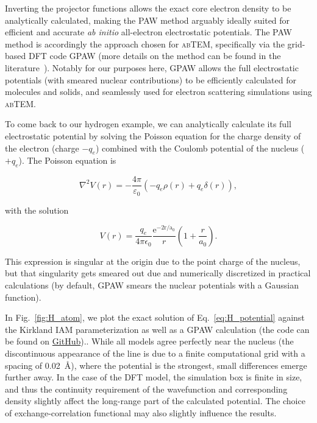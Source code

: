 \documentclass[%
 superscriptaddress,
 aip,
 amsmath,amssymb,
preprint,%
 author-year,%
longbibliography
]{revtex4-2}
\begin{document}
Inverting the projector functions allows the exact core electron density to be analytically calculated, making the PAW method arguably ideally suited for efficient and accurate \textit{ab initio} all-electron electrostatic potentials. The PAW method is accordingly the approach chosen for \textsc{abTEM}, specifically via the grid-based DFT code \textsc{GPAW} (more details on the method can be found in the literature~\cite{blochl_projector_1994,enkovaara_electronic_2010}). Notably for our purposes here, GPAW allows the full electrostatic potentials (with smeared nuclear contributions) to be efficiently calculated for molecules and solids, and seamlessly used for electron scattering simulations using \textsc{abTEM}.

To come back to our hydrogen example, we can analytically calculate its full electrostatic potential by solving the Poisson equation for the charge density of the electron (charge $-q_e$) combined with the Coulomb potential of the nucleus ($+q_e$). The Poisson equation is

\begin{equation}
\nabla^{2} V(r) = -\frac{4\pi}{\varepsilon_0} \left(-q_e \rho(r) + q_e \delta(r)\right),
\end{equation}

with the solution

\begin{equation}
V(r) = \frac{q_e}{4 \pi \epsilon_{0}} \frac{\mathrm{e^{-2 r / a_0}}}{r}\left(1 + \frac{r}{a_0}\right).
\label{eq:H_potential}
\end{equation}

This expression is singular at the origin due to the point charge of the nucleus, but that singularity gets smeared out due and numerically discretized in practical calculations (by default, GPAW smears the nuclear potentials with a Gaussian function).

In Fig.~\ref{fig:H_atom}, we plot the exact solution of Eq.~\ref{eq:H_potential} against the Kirkland IAM parameterization as well as a GPAW calculation (the code can be found on \href{https://github.com/jacobjma/hands-on-guide-to-TEM-simulations/blob/main/notebooks/toma/H_atom.ipynb}{GitHub}).. While all models agree perfectly near the nucleus (the discontinuous appearance of the line is due to a finite computational grid with a spacing of 0.02~\AA), where the potential is the strongest, small differences emerge further away. In the case of the DFT model, the simulation box is finite in size, and thus the continuity requirement of the wavefunction and corresponding density slightly affect the long-range part of the calculated potential. The choice of exchange-correlation functional may also slightly influence the results.
\end{document}
